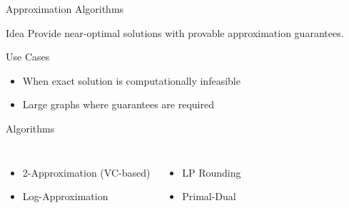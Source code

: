 \documentclass[aspectratio=169]{beamer}
\begin{document}

\begin{frame}{Approximation Algorithms}

\begin{block}{Idea}
Provide near-optimal solutions with provable approximation guarantees.
\end{block}

\vspace{0.2cm}

\begin{exampleblock}{Use Cases}
\begin{itemize}
\item When exact solution is computationally infeasible
\item Large graphs where guarantees are required
\end{itemize}
\end{exampleblock}

\vspace{0.2cm}

\begin{alertblock}{Algorithms}

\begin{columns}[T]
\begin{itemize}
\item 2-Approximation (VC-based)
\item Log-Approximation
\end{itemize}

\begin{itemize}
\item LP Rounding
\item Primal-Dual
\end{itemize}

\end{columns}

\end{alertblock}

\end{frame}
\end{document}
